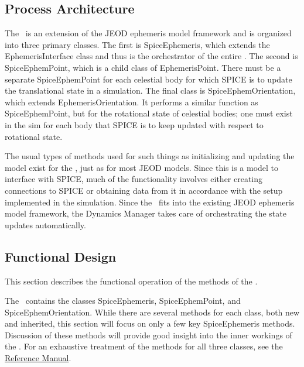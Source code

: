 \subsection{Process Architecture}
The \SpiceDesc\ is an extension of the JEOD ephemeris model framework
and is organized into three primary classes. The first is SpiceEphemeris,
which extends the EphemerisInterface class and thus is the orchestrator
of the entire \SpiceDesc. The second is SpiceEphemPoint, which is a child
class of EphemerisPoint.  There must be a separate SpiceEphemPoint for each
celestial body for which SPICE is to update the translational state in a
simulation. The final class is SpiceEphemOrientation, which extends
EphemerisOrientation. It performs a similar function as SpiceEphemPoint,
but for the rotational state of celestial bodies; one must exist in the
sim for each body that SPICE is to keep updated with respect to rotational
state.

The usual types of methods used for such things as initializing and updating
the model exist for the \SpiceDesc, just as for most JEOD models.  Since
this is a model to interface with SPICE, much of the functionality
involves either creating connections to SPICE or obtaining data from it in
accordance with the setup implemented in the simulation.  Since the
\SpiceDesc\ fits into the existing JEOD ephemeris model framework, the
Dynamics Manager takes care of orchestrating the state updates automatically.


\subsection{Functional Design}
This section describes the functional operation of the methods of the
\SpiceDesc.

The \SpiceDesc\ contains the classes SpiceEphemeris, SpiceEphemPoint, and
SpiceEphemOrientation. While there are several methods for each class, both
new and inherited, this section will focus on only a few key SpiceEphemeris
methods. Discussion of these methods will provide good insight into the inner
workings of the \SpiceDesc.  For an exhaustive treatment of the methods for
all three classes, see the \href{file:refman.pdf}{Reference Manual}\cite{api:spice}.

